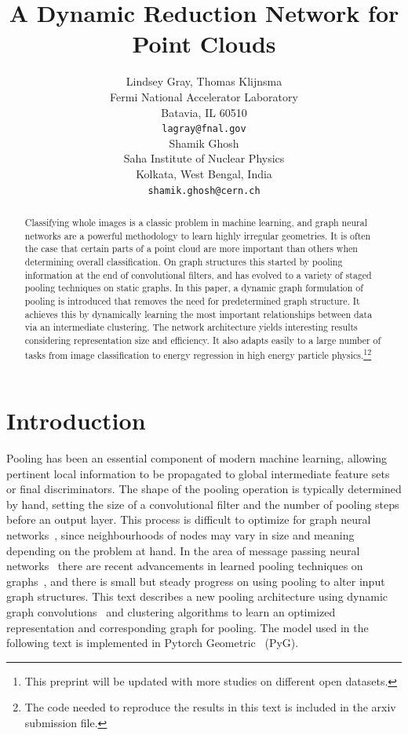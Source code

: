 \documentclass{article}
\title{A Dynamic Reduction Network for Point Clouds}
\author{
  Lindsey Gray, Thomas Klijnsma\\
  Fermi National Accelerator Laboratory\\
  Batavia, IL 60510 \\
  \texttt{lagray@fnal.gov} \\
  \And
  Shamik Ghosh \\
  Saha Institute of Nuclear Physics\\
  Kolkata, West Bengal, India \\
  \texttt{shamik.ghosh@cern.ch} \\
}
\begin{document}
\maketitle

\begin{abstract}
Classifying whole images is a classic problem in machine learning, and graph neural networks are a powerful methodology to learn highly irregular geometries.
It is often the case that certain parts of a point cloud are more important than others when determining overall classification.
On graph structures this started by pooling information at the end of convolutional filters, and has evolved to a variety of staged pooling techniques on static graphs.
In this paper, a dynamic graph formulation of pooling is introduced that removes the need for predetermined graph structure.
It achieves this by dynamically learning the most important relationships between data via an intermediate clustering.
The network architecture yields interesting results considering representation size and efficiency. 
It also adapts easily to a large number of tasks from image classification to energy regression in high energy particle physics.\footnote{This preprint will be updated with more studies on different open datasets.}\footnote{The code needed to reproduce the results in this text is included in the arxiv submission file.}
\end{abstract}




\section{Introduction}

Pooling has been an essential component of modern machine learning, allowing pertinent local information to be propagated to global intermediate feature sets or final discriminators.
The shape of the pooling operation is typically determined by hand, setting the size of a convolutional filter and the number of pooling steps before an output layer.
This process is difficult to optimize for graph neural networks~\cite{Bronstein_2017}, since neighbourhoods of nodes may vary in size and meaning depending on the problem at hand.
In the area of message passing neural networks~\cite{gilmer2017neural} there are recent advancements in learned pooling techniques on graphs~\cite{diehl2019edge}, and there is small but steady progress on using pooling to alter input graph structures.
This text describes a new pooling architecture using dynamic graph convolutions~\cite{wang2018dynamic} and clustering algorithms to learn an optimized representation and corresponding graph for pooling.
The model used in the following text is implemented in Pytorch Geometric~\cite{Fey/Lenssen/2019} (PyG).
\end{document}
